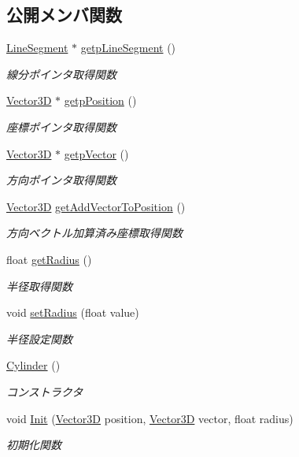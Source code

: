 \subsection*{公開メンバ関数}
\begin{DoxyCompactItemize}
\item 
\mbox{\hyperlink{class_line_segment}{Line\+Segment}} $\ast$ \mbox{\hyperlink{class_cylinder_af6e950f09496e5aac060a3f297da3ae2}{getp\+Line\+Segment}} ()
\begin{DoxyCompactList}\small\item\em 線分ポインタ取得関数 \end{DoxyCompactList}\item 
\mbox{\hyperlink{class_vector3_d}{Vector3D}} $\ast$ \mbox{\hyperlink{class_cylinder_abf7bd0ec7c85488de892601bc9e23e94}{getp\+Position}} ()
\begin{DoxyCompactList}\small\item\em 座標ポインタ取得関数 \end{DoxyCompactList}\item 
\mbox{\hyperlink{class_vector3_d}{Vector3D}} $\ast$ \mbox{\hyperlink{class_cylinder_a81a0ee46547b6c2e4e10fc821389f377}{getp\+Vector}} ()
\begin{DoxyCompactList}\small\item\em 方向ポインタ取得関数 \end{DoxyCompactList}\item 
\mbox{\hyperlink{class_vector3_d}{Vector3D}} \mbox{\hyperlink{class_cylinder_af36a39d5a18d1a837d9880a00447d87b}{get\+Add\+Vector\+To\+Position}} ()
\begin{DoxyCompactList}\small\item\em 方向ベクトル加算済み座標取得関数 \end{DoxyCompactList}\item 
float \mbox{\hyperlink{class_cylinder_a54bd26ac60e885bdca9a101fcc998711}{get\+Radius}} ()
\begin{DoxyCompactList}\small\item\em 半径取得関数 \end{DoxyCompactList}\item 
void \mbox{\hyperlink{class_cylinder_a3baa0a5587c54b7a92f170ce52d0f658}{set\+Radius}} (float value)
\begin{DoxyCompactList}\small\item\em 半径設定関数 \end{DoxyCompactList}\item 
\mbox{\hyperlink{class_cylinder_a01dc978cb576f834b9545e43d4dad2a2}{Cylinder}} ()
\begin{DoxyCompactList}\small\item\em コンストラクタ \end{DoxyCompactList}\item 
void \mbox{\hyperlink{class_cylinder_ab7d8167ece18b76e324a06482d22dacb}{Init}} (\mbox{\hyperlink{class_vector3_d}{Vector3D}} position, \mbox{\hyperlink{class_vector3_d}{Vector3D}} vector, float radius)
\begin{DoxyCompactList}\small\item\em 初期化関数 \end{DoxyCompactList}\end{DoxyCompactItemize}

